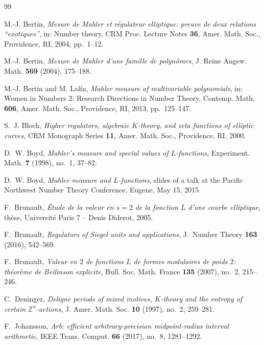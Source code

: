 \documentclass[11pt]{amsart}
\theoremstyle{definition}
\theoremstyle{remark}
\newcommand{\Z}{\mathbb{Z}}
\begin{document}
\begin{thebibliography}{99}

M.-J. Bertin,
\emph{Mesure de Mahler et r\'egulateur elliptique: preuve de deux relations
``exotiques''},
in: Number theory, CRM Proc. Lecture Notes \textbf{36}, Amer. Math. Soc.,
Providence, RI, 2004, pp.~1--12.

M.-J. Bertin,
\emph{Mesure de Mahler d'une famille de polyn\^omes},
J. Reine Angew. Math. \textbf{569} (2004), 175--188.

M.-J. Bertin and M. Lal\'in,
\emph{Mahler measure of multivariable polynomials},
in: Women in Numbers 2: Research Directions in Number Theory,
Contemp. Math. \textbf{606}, Amer. Math. Soc., Providence, RI, 2013,
pp.~125--147.

S.~J. Bloch,
\emph{Higher regulators, algebraic $K$-theory, and zeta functions of
elliptic curves},
CRM Monograph Series \textbf{11}, Amer. Math. Soc., Providence, RI, 2000.

D.~W. Boyd,
\emph{Mahler's measure and special values of $L$-functions},
Experiment. Math. \textbf{7} (1998), no.~1, 37--82.

D.~W. Boyd,
\emph{Mahler measure and $L$-functions},
slides of a talk at the Pacific Northwest Number Theory Conference,
Eugene, May 15, 2015.

F.~Brunault,
\emph{\'Etude de la valeur en $s=2$ de la fonction $L$ d'une courbe
elliptique},
th\`ese, Universit\'e Paris 7 -- Denis Diderot, 2005.

F.~Brunault,
\emph{Regulators of Siegel units and applications},
J.~Number Theory \textbf{163} (2016), 542--569.

F.~Brunault,
\emph{Valeur en $2$ de fonctions $L$ de formes modulaires de poids $2$:
th\'eor\`eme de Beilinson explicite},
Bull. Soc. Math. France \textbf{135} (2007), no.~2, 215--246.

C.~Deninger,
\emph{Deligne periods of mixed motives, $K$-theory and the entropy of
certain $\Z^n$-actions},
J. Amer. Math. Soc. \textbf{10} (1997), no.~2, 259--281.

F.~Johansson,
\emph{Arb: efficient arbitrary-precision midpoint-radius interval
arithmetic},
IEEE Trans. Comput. \textbf{66} (2017), no.~8, 1281--1292.


\end{thebibliography}
\end{document}
